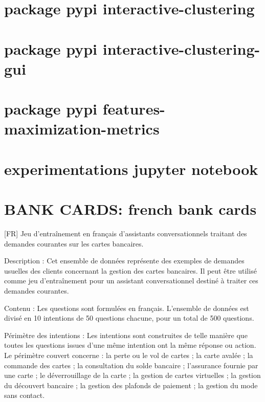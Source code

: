 \label{annex:B-ANNEXE-TECHNIQUE}

	\minitoc

    \section{package pypi interactive-clustering}
    \section{package pypi interactive-clustering-gui}
    \section{package pypi features-maximization-metrics}
    \section{experimentations jupyter notebook}

\label{annex:C-ANNEXE-DATASET}

	\minitoc

    \section{BANK CARDS: french bank cards}
	\label{annex:C.1-DATASET-BANK-CARDS}
	
		[FR] Jeu d'entraînement en français d'assistants conversationnels traitant des demandes courantes sur les cartes bancaires.
		
		Description : Cet ensemble de données représente des exemples de demandes usuelles des clients concernant la gestion des cartes bancaires. Il peut être utilisé comme jeu d'entraînement pour un assistant conversationnel destiné à traiter ces demandes courantes.
		
		Contenu : Les questions sont formulées en français. L'ensemble de données est divisé en 10 intentions de 50 questions chacune, pour un total de 500 questions.
		
		Périmètre des intentions : Les intentions sont construites de telle manière que toutes les questions issues d'une même intention ont la même réponse ou action. Le périmètre couvert concerne : la perte ou le vol de cartes ; la carte avalée ; la commande des cartes ; la consultation du solde bancaire ; l'assurance fournie par une carte ; le déverrouillage de la carte ; la gestion de cartes virtuelles ; la gestion du découvert bancaire ; la gestion des plafonds de paiement ; la gestion du mode sans contact.
		
